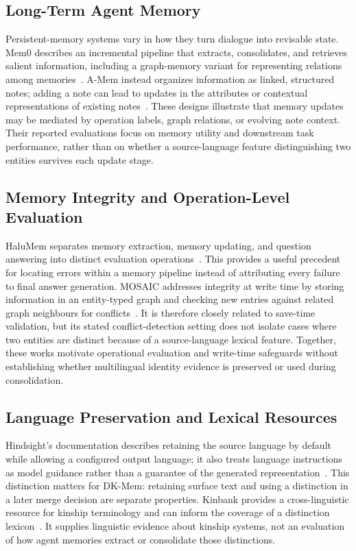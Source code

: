 \documentclass[conference]{IEEEtran}
\begin{document}
\subsection{Long-Term Agent Memory}
Persistent-memory systems vary in how they turn dialogue into revisable state. Mem0 describes an incremental pipeline that extracts, consolidates, and retrieves salient information, including a graph-memory variant for representing relations among memories~\cite{mem0}. A-Mem instead organizes information as linked, structured notes; adding a note can lead to updates in the attributes or contextual representations of existing notes~\cite{amem}. These designs illustrate that memory updates may be mediated by operation labels, graph relations, or evolving note context. Their reported evaluations focus on memory utility and downstream task performance, rather than on whether a source-language feature distinguishing two entities survives each update stage.

\subsection{Memory Integrity and Operation-Level Evaluation}
HaluMem separates memory extraction, memory updating, and question answering into distinct evaluation operations~\cite{halumem}. This provides a useful precedent for locating errors within a memory pipeline instead of attributing every failure to final answer generation. MOSAIC addresses integrity at write time by storing information in an entity-typed graph and checking new entries against related graph neighbours for conflicts~\cite{mosaic}. It is therefore closely related to save-time validation, but its stated conflict-detection setting does not isolate cases where two entities are distinct because of a source-language lexical feature. Together, these works motivate operational evaluation and write-time safeguards without establishing whether multilingual identity evidence is preserved or used during consolidation.

\subsection{Language Preservation and Lexical Resources}
Hindsight's documentation describes retaining the source language by default while allowing a configured output language; it also treats language instructions as model guidance rather than a guarantee of the generated representation~\cite{hindsight}. This distinction matters for DK-Mem: retaining surface text and using a distinction in a later merge decision are separate properties. Kinbank provides a cross-linguistic resource for kinship terminology and can inform the coverage of a distinction lexicon~\cite{kinbank}. It supplies linguistic evidence about kinship systems, not an evaluation of how agent memories extract or consolidate those distinctions.
\end{document}
